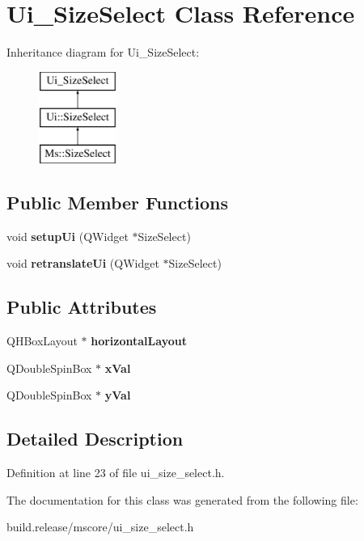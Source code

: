 \hypertarget{class_ui___size_select}{}\section{Ui\+\_\+\+Size\+Select Class Reference}
\label{class_ui___size_select}
Inheritance diagram for Ui\+\_\+\+Size\+Select\+:\begin{figure}[H]
\begin{center}
\leavevmode
\includegraphics[height=3.000000cm]{class_ui___size_select}
\end{center}
\end{figure}
\subsection*{Public Member Functions}
\begin{DoxyCompactItemize}
\item 
\mbox{\label{class_ui___size_select_a62da16ee266a7753cffba6f74f1cc3ba}} 
void {\bfseries setup\+Ui} (Q\+Widget $\ast$Size\+Select)
\item 
\mbox{\label{class_ui___size_select_a3332ac9911b0204a60cd7a5f3fbaca50}} 
void {\bfseries retranslate\+Ui} (Q\+Widget $\ast$Size\+Select)
\end{DoxyCompactItemize}
\subsection*{Public Attributes}
\begin{DoxyCompactItemize}
\item 
\mbox{\label{class_ui___size_select_a8bba754f7fd2cffcf924a2279785c6ec}} 
Q\+H\+Box\+Layout $\ast$ {\bfseries horizontal\+Layout}
\item 
\mbox{\label{class_ui___size_select_ad2bf704152cec99d67baff794578a4d4}} 
Q\+Double\+Spin\+Box $\ast$ {\bfseries x\+Val}
\item 
\mbox{\label{class_ui___size_select_a879c9d8cd6b04c8be386cbf4fc326aaf}} 
Q\+Double\+Spin\+Box $\ast$ {\bfseries y\+Val}
\end{DoxyCompactItemize}


\subsection{Detailed Description}


Definition at line 23 of file ui\+\_\+size\+\_\+select.\+h.



The documentation for this class was generated from the following file\+:\begin{DoxyCompactItemize}
\item 
build.\+release/mscore/ui\+\_\+size\+\_\+select.\+h\end{DoxyCompactItemize}
